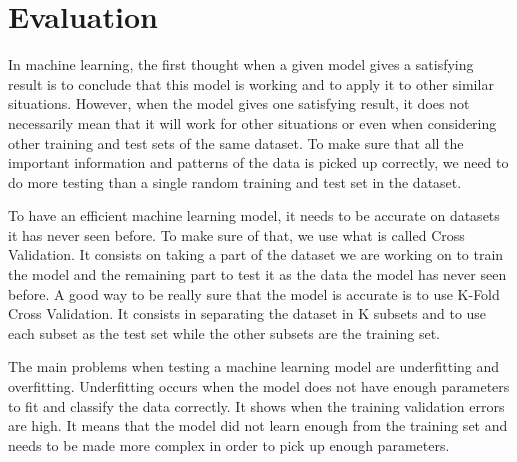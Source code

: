 \documentclass[conference]{IEEEtran}
\begin{document}



\section{Evaluation}
\textcolor{baptiste}{In machine learning, the first thought when a given model gives a satisfying result is to conclude that this model is working and to apply it to other similar situations. However, when the model gives one satisfying result, it does not necessarily mean that it will work for other situations or even when considering other training and test sets of the same dataset. To make sure that all the important information and patterns of the data is picked up correctly, we need to do more testing than a single random training and test set in the dataset.}

\textcolor{baptiste}{To have an efficient machine learning model, it needs to be accurate on datasets it has never seen before. To make sure of that, we use what is called Cross Validation. It consists on taking a part of the dataset we are working on to train the model and the remaining part to test it as the data the model has never seen before.
A good way to be really sure that the model is accurate is to use K-Fold Cross Validation. It consists in separating the dataset in K subsets and to use each subset as the test set while the other subsets are the training set. 
}


\textcolor{baptiste}{The main problems when testing a machine learning model are underfitting and overfitting. Underfitting occurs when the model does not have enough parameters to fit and classify the data correctly. It shows when the training validation errors are high. It means that the model did not learn enough from the training set and needs to be made more complex in order to pick up enough parameters.}
\end{document}
